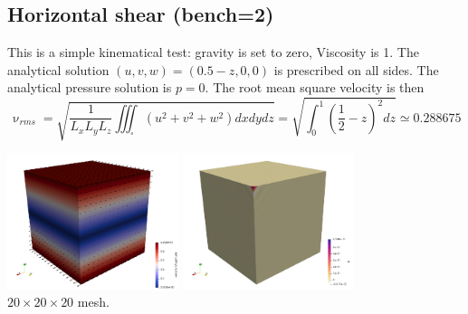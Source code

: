 \newpage
\subsection*{Horizontal shear (bench=2)}

This is a simple kinematical test: gravity is set to zero, 
Viscosity is 1.
The analytical solution $(u,v,w)=(0.5-z,0,0)$ is prescribed on all sides. 
The analytical pressure solution is $p=0$.
The root mean square velocity is then
\[
\upnu_{rms}
=\sqrt{ \frac{1}{L_xL_yL_z} \iiint_\square (u^2+v^2+w^2)dxdydz }
=\sqrt{ \int_0^1 (\frac12-z)^2dz  }
\simeq 0.288675
\]

\begin{center}
\includegraphics[width=5cm]{python_codes/fieldstone_82/results/bench2/vel}
\includegraphics[width=5cm]{python_codes/fieldstone_82/results/bench2/press}\\
{\captionfont $20\times 20 \times 20$ mesh.} 
\end{center}


